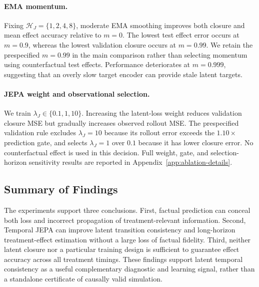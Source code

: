 \paragraph{EMA momentum.}
Fixing $\mathcal H_J=\{1,2,4,8\}$, moderate EMA smoothing improves both
closure and mean effect accuracy relative to $m=0$. The lowest test
effect error occurs at $m=0.9$, whereas the lowest validation closure
occurs at $m=0.99$. We retain the prespecified $m=0.99$ in the main
comparison rather than selecting momentum using counterfactual test
effects. Performance deteriorates at $m=0.999$, suggesting that an
overly slow target encoder can provide stale latent targets.

\paragraph{JEPA weight and observational selection.}
We train $\lambda_J\in\{0.1,1,10\}$. Increasing the latent-loss weight
reduces validation closure MSE but gradually increases observed rollout
MSE. The prespecified validation rule excludes $\lambda_J=10$ because
its rollout error exceeds the $1.10\times$ prediction gate, and selects
$\lambda_J=1$ over $0.1$ because it has lower closure error. No
counterfactual effect is used in this decision. Full weight, gate, and
selection-horizon sensitivity results are reported in
Appendix~\ref{app:ablation-details}.

\subsection{Summary of Findings}

The experiments support three conclusions. First, factual prediction can
conceal both loss and incorrect propagation of treatment-relevant
information. Second, Temporal JEPA can improve latent transition
consistency and long-horizon treatment-effect estimation without a large
loss of factual fidelity. Third, neither latent closure nor a particular
training design is sufficient to guarantee effect accuracy across all
treatment timings. These findings support latent temporal consistency as
a useful complementary diagnostic and learning signal, rather than a
standalone certificate of causally valid simulation.
